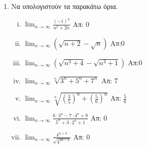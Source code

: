 \documentclass[a4paper,table]{report}
\begin{document}
\begin{enumerate}
\item Να υπολογιστούν τα παρακάτω όρια.

  \begin{enumerate}[i)]
    \item $ \lim_{n \to \infty} \frac{(-1)^{n}}{n^{2}+2n}  $ \hfill Απ: 0  
    \item $ \lim_{n \to \infty} (\sqrt{n+2} - \sqrt{n})  $ \hfill Απ:0
    \item $ \lim_{n \to \infty} (\sqrt{n^{3}+4} - \sqrt{n^{3}+1})  $ \hfill Απ:0
    \item $ \lim_{n \to \infty} \sqrt[n]{3^{n}+5^{n}+7^{n}}  $ \hfill Απ: 7 
    \item $ \lim_{n \to \infty} \sqrt[n]{\left(\frac{3}{5} \right)^{n} + 
      \left(\frac{5}{6} \right)^{n}} $ \hfill Απ: $ \frac{5}{6} $ 
    \item $ \lim_{n \to \infty} \frac{6\cdot 3^{n}-7 \cdot 4^{n}+8}
      {5^{n}+3\cdot 2^{n}+1} $ \hfill Απ: 0  
    \item $ \lim_{n \to \infty} \frac{4^{n+3}}{\sqrt{4^{4n-2}}} $ \hfill Απ: 0  
  \end{enumerate}
\end{enumerate}
\end{document}
